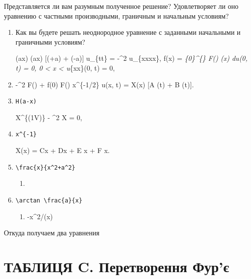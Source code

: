 \documentclass[
  ukrainian,
]{article}
\providecommand{\tightlist}{%
  \setlength{\itemsep}{0pt}\setlength{\parskip}{0pt}}
\begin{document}
Представляется ли вам разумным полученное решение? Удовлетворяет ли оно
уравнению с частными производными, граничным и начальным условиям?

\begin{enumerate}
\def\labelenumi{\arabic{enumi}.}
\setcounter{enumi}{6}
\item
  Как вы будете решать неоднородное уравнение с заданными начальными и
  граничными условиям?

   \cos(ax) \cos(ax) 
  {[}\delta(\omega+a) + \delta(\omega-a){]} u\_\{tt\} = -\alpha\^{}2
  u\_\{xxxx\}, f(x) = \int\emph{\{0\}\^{}\{\infty\} F(\omega)
  \sin(\omega x) d\omega u(0, t) = 0, 0 \textless{} x \textless{} \infty
  u}\{xx\}(0, t) = 0,
\item
  -\omega\^{}2 F(\omega) +  \omega f(0) 
  F\left(\frac{\omega}{\alpha}\right)
   x\^{}\{-1/2\} u(x, t) = X(x)
  {[}A \sin(\omega t) + B \cos(\omega t){]}.
\item
  \texttt{H(a-x)}

  X\^{}\{(1V)\} - \omega\^{}2 X = 0,
\item
  \texttt{x\^{}\{-1\}}

  X(x) = C\cos\sqrt{\omega}x + D\sin\sqrt{\omega}x + E
  \cosh\sqrt{\omega}x + F \sinh\sqrt{\omega}x.
\item
  \texttt{\textbackslash{}frac\{x\}\{x\^{}2+a\^{}2\}}

  \begin{enumerate}
  \def\labelenumii{\arabic{enumii}.}
  \setcounter{enumii}{7}
  \item
  \end{enumerate}
\item
  \texttt{\textbackslash{}arctan\ \textbackslash{}frac\{a\}\{x\}}

  \begin{enumerate}
  \def\labelenumii{\arabic{enumii}.}
  \setcounter{enumii}{9}
  \tightlist
  \item
    -x\^{}2/(x)
  \end{enumerate}
\end{enumerate}

Откуда получаем два уравнения

\section{ТАБЛИЦЯ C. Перетворення
Фур'є}\label{ux442ux430ux431ux43bux438ux446ux44f-c.-ux43fux435ux440ux435ux442ux432ux43eux440ux435ux43dux43dux44f-ux444ux443ux440ux454}
\end{document}
